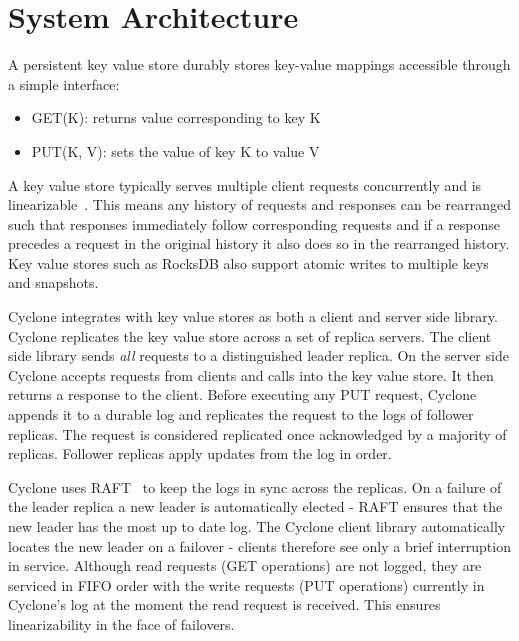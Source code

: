 \documentclass[pageno]{jpaper}
\begin{document}
\section{System Architecture}
\label{sec:sysarch}
A persistent key value store durably stores key-value mappings accessible through a
simple interface:

\begin{itemize}
\item GET(K): returns value corresponding to key K
\item PUT(K, V): sets the value of key K to value V
\end{itemize}

A key value store typically serves multiple client requests concurrently and is
linearizable~\cite{linearizability}. This means any history of requests and
responses can be rearranged such that responses immediately follow corresponding
requests and if a response precedes a request in the original history it also
does so in the rearranged history. Key value stores such as RocksDB also
support atomic writes to multiple keys and snapshots. 

Cyclone integrates with key value stores as both a client and server side
library. Cyclone replicates the key value store across a set of replica
servers. The client side library sends \emph{all} requests to a distinguished
leader replica.  On the server side Cyclone accepts requests from clients and calls
into the key value store. It then returns a response to the client. Before
executing any PUT request, Cyclone appends it to a durable log and replicates
the request to the logs of follower replicas. The request is considered
replicated once acknowledged by a majority of replicas. Follower replicas apply
updates from the log in order.

Cyclone uses RAFT~\cite{raft} to keep the logs in sync across the replicas. On a
failure of the leader replica a new leader is automatically elected - RAFT
ensures that the new leader has the most up to date log. The Cyclone client
library automatically locates the new leader on a failover - clients therefore
see only a brief interruption in service. Although read requests (GET
operations) are not logged, they are serviced in FIFO order with the write requests
(PUT operations) currently in Cyclone's log at the moment the read request is
received. This ensures linearizability in the face of failovers.
\end{document}
